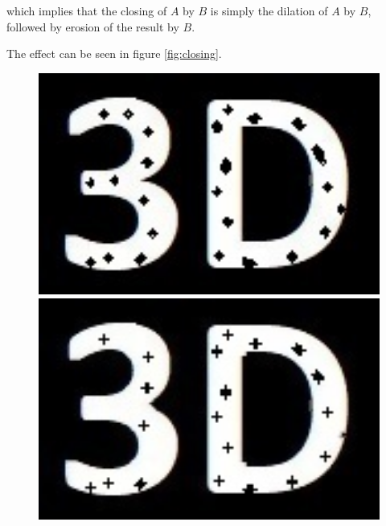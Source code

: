 which implies that the closing of $A$ by $B$ is simply the dilation of $A$ by $B$, followed by erosion of the result by $B$. 

The effect can be seen in figure \ref{fig:closing}. 
 \begin{figure}[h!]
 	\centering
 	\begin{minipage}[t]{0.24\textwidth}
 		\centering
 		\includegraphics[width=1\textwidth]{figures/ImageAnalysis/Reconstruct/reconstruct_3D_Close.jpg}
 	\end{minipage}
 	\begin{minipage}[t]{0.24\textwidth}
 		\centering	
 		\includegraphics[width=1\textwidth]{figures/ImageAnalysis/Reconstruct/3D_Close_Cross.jpg}
 	\end{minipage}
 	\begin{minipage}[t]{0.24\textwidth}
 		\centering	

\end{minipage}
\end{figure}
